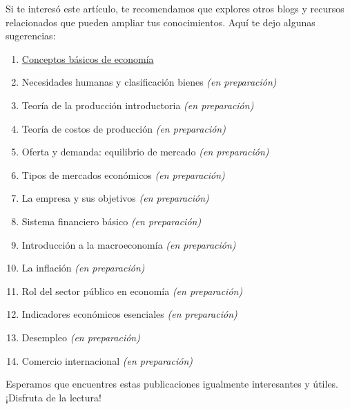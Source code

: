 \documentclass[
  jou,
  floatsintext,
  longtable,
  a4paper,
  nolmodern,
  notxfonts,
  notimes,
  12pt,
  colorlinks=true,linkcolor=blue,citecolor=blue,urlcolor=blue]{apa7}
\providecommand{\tightlist}{%
  \setlength{\itemsep}{0pt}\setlength{\parskip}{0pt}}
\begin{document}
Si te interesó este artículo, te recomendamos que explores otros blogs y
recursos relacionados que pueden ampliar tus conocimientos. Aquí te dejo
algunas sugerencias:

\begin{enumerate}
\def\labelenumi{\arabic{enumi}.}
\tightlist
\item
  \href{https://propaedeutica.netlify.app/economia/2014-01-01-01-conceptos-basicos-de-economia/index.pdf}{}
  \href{https://propaedeutica.netlify.app/economia/2014-01-01-01-conceptos-basicos-de-economia}{Conceptos
  básicos de economía}
\item
  Necesidades humanas y clasificación bienes \emph{(en preparación)}
\item
  Teoría de la producción introductoria \emph{(en preparación)}
\item
  Teoría de costos de producción \emph{(en preparación)}
\item
  Oferta y demanda: equilibrio de mercado \emph{(en preparación)}
\item
  Tipos de mercados económicos \emph{(en preparación)}
\item
  La empresa y sus objetivos \emph{(en preparación)}
\item
  Sistema financiero básico \emph{(en preparación)}
\item
  Introducción a la macroeconomía \emph{(en preparación)}
\item
  La inflación \emph{(en preparación)}
\item
  Rol del sector público en economía \emph{(en preparación)}
\item
  Indicadores económicos esenciales \emph{(en preparación)}
\item
  Desempleo \emph{(en preparación)}
\item
  Comercio internacional \emph{(en preparación)}
\end{enumerate}

Esperamos que encuentres estas publicaciones igualmente interesantes y
útiles. ¡Disfruta de la lectura!
\end{document}
